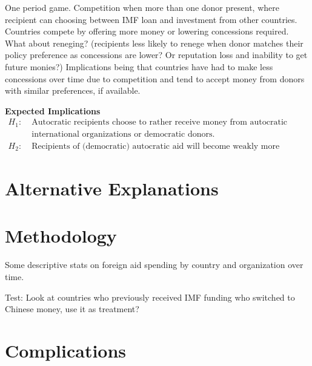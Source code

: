 One period game. Competition when more than one donor present, where recipient can choosing between IMF loan and investment from other countries. Countries compete by offering more money or lowering concessions required. What about reneging? (recipients less likely to renege when donor matches their policy preference as concessions are lower? Or reputation loss and inability to get future monies?)  Implications being that countries have had to make less concessions over time due to competition and tend to accept money from donors with similar preferences, if available.

\textbf{Expected Implications} 
\begin{align*}
    H_1:\; &\text{Autocratic recipients choose to rather receive money from autocratic donors than}\\
    &\text{international organizations or democratic donors.}\\
    H_2:\; &\text{Recipients of (democratic) autocratic aid will become weakly more (democratic) autocratic.}
\end{align*}

\section*{Alternative Explanations}

\section*{Methodology}
Some descriptive stats on foreign aid spending by country and organization over time. 

Test: Look at countries who previously received IMF funding who switched to Chinese money, use it as treatment?

\section*{Complications}
